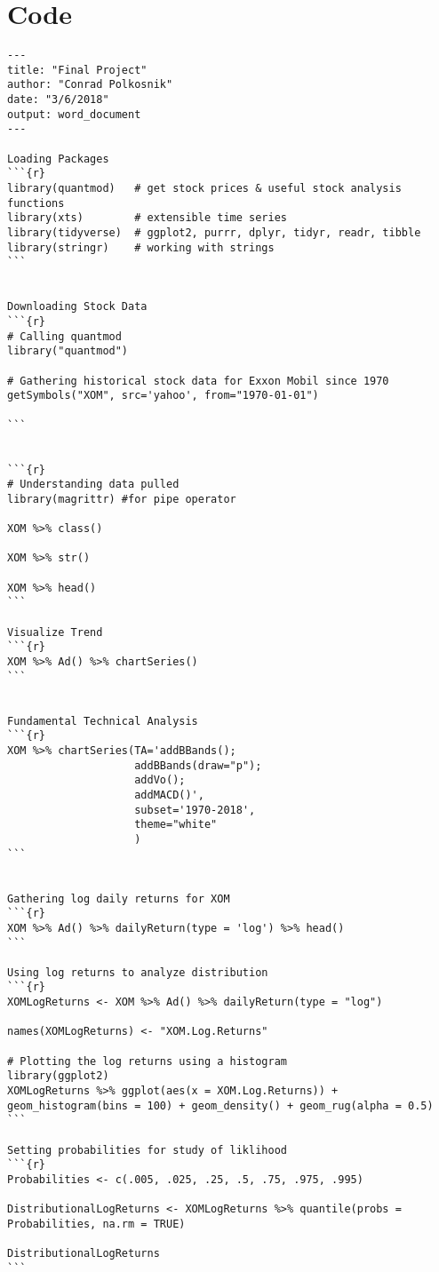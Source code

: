 \documentclass{article}
\begin{document}
\section{Code}
\begin{verbatim}
---
title: "Final Project"
author: "Conrad Polkosnik"
date: "3/6/2018"
output: word_document
---

Loading Packages
```{r}
library(quantmod)   # get stock prices & useful stock analysis functions
library(xts)        # extensible time series
library(tidyverse)  # ggplot2, purrr, dplyr, tidyr, readr, tibble
library(stringr)    # working with strings
```


Downloading Stock Data
```{r}
# Calling quantmod
library("quantmod")

# Gathering historical stock data for Exxon Mobil since 1970
getSymbols("XOM", src='yahoo', from="1970-01-01")

```


```{r}
# Understanding data pulled
library(magrittr) #for pipe operator

XOM %>% class()

XOM %>% str()

XOM %>% head()
```

Visualize Trend
```{r}
XOM %>% Ad() %>% chartSeries()
```


Fundamental Technical Analysis
```{r}
XOM %>% chartSeries(TA='addBBands();
                    addBBands(draw="p");
                    addVo();
                    addMACD()',
                    subset='1970-2018',
                    theme="white"
                    )
```


Gathering log daily returns for XOM
```{r}
XOM %>% Ad() %>% dailyReturn(type = 'log') %>% head()
```

Using log returns to analyze distribution
```{r}
XOMLogReturns <- XOM %>% Ad() %>% dailyReturn(type = "log")

names(XOMLogReturns) <- "XOM.Log.Returns"

# Plotting the log returns using a histogram
library(ggplot2)
XOMLogReturns %>% ggplot(aes(x = XOM.Log.Returns)) + geom_histogram(bins = 100) + geom_density() + geom_rug(alpha = 0.5)
```

Setting probabilities for study of liklihood
```{r}
Probabilities <- c(.005, .025, .25, .5, .75, .975, .995)

DistributionalLogReturns <- XOMLogReturns %>% quantile(probs = Probabilities, na.rm = TRUE)

DistributionalLogReturns
```



\end{verbatim}
\end{document}
